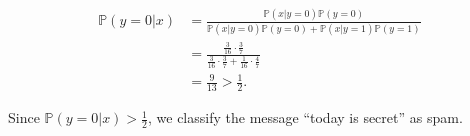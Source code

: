 \documentclass[twoside,10pt]{article}
\begin{document}
\begin{enumerate}
\begin{enumerate}
\begin{tcolorbox}
\begin{itemize}
\begin{align*}
\mathbb P (y = 0 | x) &= \frac{\mathbb P (x| y = 0) \mathbb P(y=0)}{ \mathbb P (x| y = 0) \mathbb P(y=0) + \mathbb P (x| y = 1) \mathbb P(y=1) }\\
&= \frac{\frac{3}{16} \cdot \frac{3}{7}}{ \frac{3}{16} \cdot \frac{3}{7} + \frac{1}{16} \cdot \frac{4}{7} } \\
&= \frac{9}{13} > \frac 1 2.
\end{align*}
\end{itemize}
Since $\mathbb P (y = 0 | x) > \frac 1 2$, we classify the message ``\textsf{today is secret}'' as spam.
\end{tcolorbox}
\end{enumerate}

\end{enumerate}
\end{document}
